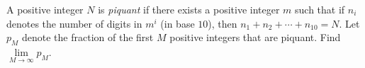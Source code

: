 A positive integer $N$ is \emph{piquant} if there exists a positive integer $m$ such that if $n_i$ denotes the number of digits in $m^i$ (in base $10$), then $n_1+n_2+\cdots + n_{10}=N$. Let $p_M$ denote the fraction of the first $M$ positive integers that are piquant. Find $\lim\limits_{M\to \infty} p_M$.

